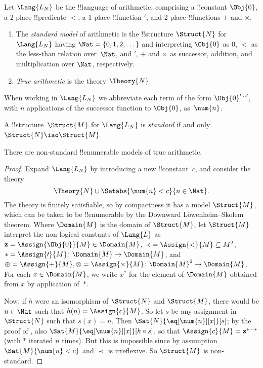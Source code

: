 \documentclass[../../../include/open-logic-section]{subfiles}
\begin{document}

\begin{defn}
Let $\Lang{L_N}$ be the !!{language} of arithmetic, comprising a
!!{constant} $\Obj{0}$, a 2-place !!{predicate} $<$, a 1-place
!!{function} $\prime$, and 2-place !!{function}s $+$ and $\times$.
\begin{enumerate}
\item The \emph{standard model} of arithmetic is the !!{structure}
  $\Struct{N}$ for $\Lang{L_N}$ having $\Nat = \{ 0, 1, 2, \dots\}$
  and interpreting $\Obj{0}$ as $0$, $<$ as the less-than relation
  over~$\Nat$, and $\prime$, $+$ and $\times$ as successor, addition,
  and multiplication over $\Nat$, respectively.
\item \emph{True arithmetic} is the theory $\Theory{N}$.
\end{enumerate}
\end{defn}

When working in $\Lang{L_N}$ we abbreviate each term of
the form $\Obj{0}^{\prime\dots\prime}$, with $n$ applications of the
successor function to $\Obj{0}$, as~$\num{n}$.

\begin{defn}
A !!{structure}~$\Struct{M}$ for $\Lang{L_N}$ is \emph{standard} if
and only $\Struct{N} \iso \Struct{M}$.
\end{defn}

\begin{thm}
There are non-standard !!{enumerable} models of true arithmetic.
\end{thm}

\begin{proof}
Expand $\Lang{L_N}$ by introducing a new !!{constant}~$c$, and
consider the theory
\[
\Theory{N} \cup \Setabs{\num{n} < c}{n \in \Nat}.
\]
The theory is finitely satisfiable, so by compactness it has a model
$\Struct{M}$, which can be taken to be !!{enumerable} by the Downward
L\"owenheim--Skolem theorem. Where $\Domain{M}$ is the domain of
$\Struct{M}$, let $\Struct{M}$ interpret the non-logical constants of
$\Lang{L}$ as $\mathbf{z} = \Assign{\Obj{0}}{M} \in \Domain{M}$, ${\prec} =
\Assign{<}{M} \subseteq M^2$, $* = \Assign{\prime}{M} \colon
\Domain{M} \to \Domain{M}$, and $\oplus = \Assign{+}{M}, \otimes =
\Assign{\times}{M} \colon \Domain{M}^2 \to \Domain{M}$. For each $x
\in \Domain{M}$, we write $x^*$ for the element of $\Domain{M}$
obtained from $x$ by application of~$*$.

Now, if $h$ were an isomorphism of $\Struct{N}$ and $\Struct{M}$,
there would be $n \in \Nat$ such that $h(n) = \Assign{c}{M}$.  So let
$s$ be any assignment in $\Struct{N}$ such that $s(x) = n$. Then
$\Sat{N}{\eq[\num{n}][x]}[s]$; by the proof of ,
also $\Sat{M}{\eq[\num{n}][x]}[h \circ s]$, so that $\Assign{c}{M} =
\mathbf{z}^{*\cdots *}$ (with $*$ iterated $n$ times). But this is impossible
since by assumption $\Sat{M}{\num{n} < c}$ and $\prec$ is
irreflexive. So $\Struct{M}$ is non-standard.
\end{proof}
\end{document}
